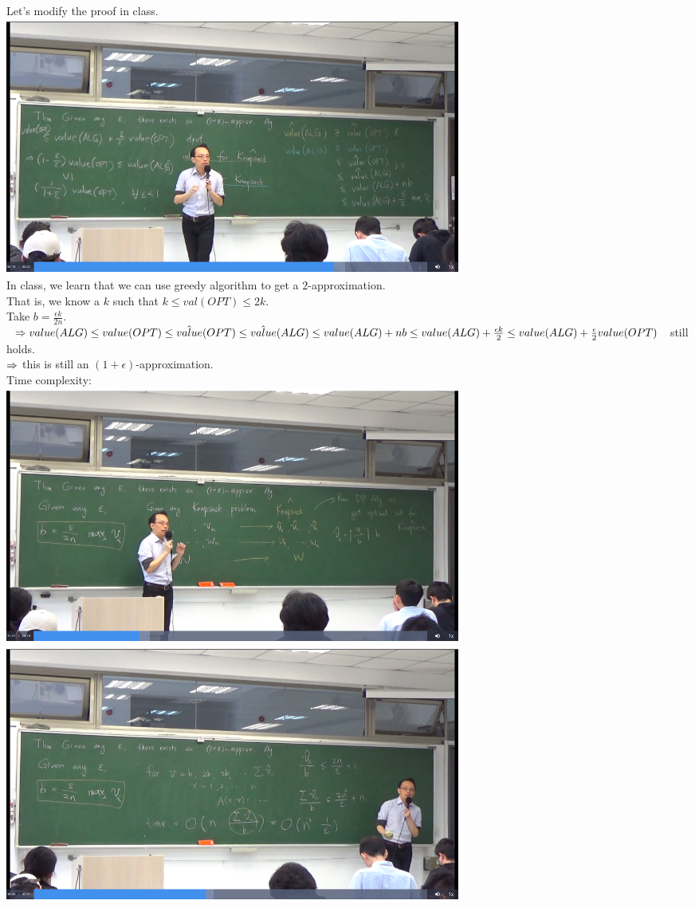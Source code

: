 \begin{pr}
Let's modify the proof in class.\\
\includegraphics[width=15cm]{p3.png}\\
In class, we learn that we can use greedy algorithm to get a $2$-approximation.\\
That is, we know a $k$ such that $k\leq val(OPT)\leq2k$.\\
Take $b=\frac{\epsilon k}{2n}$.\\
$\Rightarrow value(ALG)\leq value(OPT)\leq\hat{value}(OPT)\leq\hat{value}(ALG)\leq value(ALG)+nb\leq value(ALG)+\frac{\epsilon k}2\leq value(ALG)+\frac\epsilon2value(OPT)$ still holds.\\
$\Rightarrow$ this is still an $(1+\epsilon)$-approximation.\\
Time complexity:\\
\includegraphics[width=15cm]{p3t0.png}\\
\includegraphics[width=15cm]{p3t.png}\\

\end{pr}
